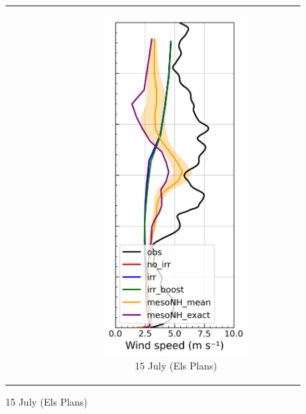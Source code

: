 \begin{figure}[hbtp]
{\begin{tabular}{@{}cccc@{}}
\begin{subfigure}[t]{0.289\textwidth}
        \end{subfigure} &
        \begin{subfigure}[t]{0.283\textwidth}
            \caption{15 July (Els Plans)}
            \includegraphics[width=\textwidth]{images/chap5/profiles/profile_elsplans_wind_speed_1507_.png}

\end{subfigure}
\end{tabular}}
\end{figure}
